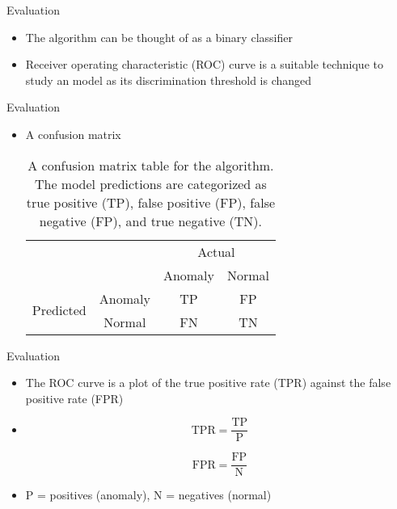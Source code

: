 \begin{frame}{Evaluation}
    \begin{itemize}
        \item The \mlblink algorithm can be thought of as a binary classifier
        \item Receiver operating characteristic (ROC) curve is a suitable technique to study an \mlblink model as its discrimination threshold is changed
    \end{itemize}
\end{frame}

\begin{frame}{Evaluation}
    \begin{itemize}
        \item A confusion matrix
            \begin{table}[H]
                \begin{tabular}{cc|cc}
                    \multicolumn{2}{c}{}
                    & \multicolumn{2}{c}{Actual} \\
                    &       &   Anomaly &   Normal \\ 
                    \cline{2-4}
                    \multirow{2}{*}{Predicted}
                        & Anomaly         & TP   & FP  \\
                        & Normal    & FN   & TN  \\ 
                        \cline{2-4}
                \end{tabular}
                \caption{A confusion matrix table for the \mlblink algorithm. The model predictions are categorized as true positive (TP), false positive (FP), false negative (FP), and true negative (TN).}
                \label{table:confusion-matrix}
            \end{table}
    \end{itemize}
\end{frame}

\begin{frame}{Evaluation}
    \begin{itemize}
        \item The ROC curve is a plot of the true positive rate (TPR) against the false positive rate (FPR)
        \item[\xspace]
            \begin{equation} \label{eq:tpr}
                \text{TPR} = \dfrac{\text{TP}}{\text{P}}
            \end{equation}
            
            \begin{equation} \label{eq:fpr}
                \text{FPR} = \dfrac{\text{FP}}{\text{N}}
            \end{equation}  
        \item P = positives (anomaly), N = negatives (normal)
    \end{itemize}
\end{frame}

